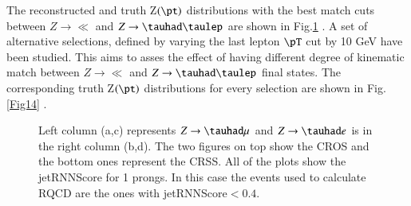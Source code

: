 The reconstructed and truth Z$(\pt)$ distributions with the best match cuts between $Z\to\ll$ and $Z\to\tauhad\taulep$ are shown in Fig.\ref{Fig13} . A set of alternative selections, defined by varying the last lepton $\pT$ cut by 10 GeV have been studied. This aims to asses the effect of having different degree of kinematic match between $Z\to\ll$ and $Z\to\tauhad\taulep$ final states. The corresponding truth Z$(\pt)$ distributions for every selection are shown in Fig.\ref{Fig14} .

\begin{figure}[htbp]
	\centering
	\hfill
	\caption{Left column (a,c) represents $Z\to\tauhad\mu$ and $Z\to\tauhad e$ is in the right column (b,d). The two figures on top show the CROS and the bottom ones represent the CRSS. All of the plots show the jetRNNScore for 1 prongs. In this case the events used to calculate RQCD are the ones with jetRNNScore$<0.4$.  }
	\label{Fig13}
\end{figure}

